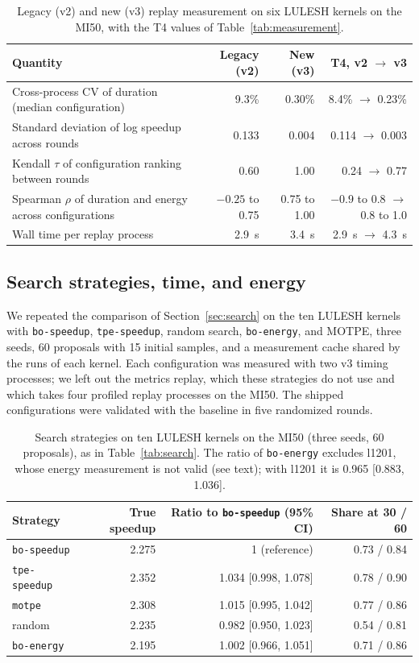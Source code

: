 \documentclass[10pt]{article}
\newcommand{\code}[1]{\texttt{#1}}
\begin{document}
\begin{table}[t]
\centering
\caption{Legacy (v2) and new (v3) replay measurement on six LULESH kernels on the MI50, with the T4 values of Table~\ref{tab:measurement}.}
\label{tab:mi50measurement}
\begin{tabular}{lrrr}
\toprule
Quantity & Legacy (v2) & New (v3) & T4, v2 $\to$ v3 \\
\midrule
Cross-process CV of duration (median configuration) & 9.3\% & 0.30\% & 8.4\% $\to$ 0.23\% \\
Standard deviation of log speedup across rounds & 0.133 & 0.004 & 0.114 $\to$ 0.003 \\
Kendall $\tau$ of configuration ranking between rounds & 0.60 & 1.00 & 0.24 $\to$ 0.77 \\
Spearman $\rho$ of duration and energy across configurations & $-0.25$ to 0.75 & 0.75 to 1.00 & $-0.9$ to 0.8 $\to$ 0.8 to 1.0 \\
Wall time per replay process & 2.9~s & 3.4~s & 2.9~s $\to$ 4.3~s \\
\bottomrule
\end{tabular}
\end{table}

\subsection{Search strategies, time, and energy}
\label{sec:amd-search}
We repeated the comparison of Section~\ref{sec:search} on the ten LULESH
kernels with \code{bo-speedup}, \code{tpe-speedup}, random search,
\code{bo-energy}, and MOTPE, three seeds, 60 proposals with 15 initial samples,
and a measurement cache shared by the runs of each kernel. Each configuration
was measured with two v3 timing processes; we left out the metrics replay,
which these strategies do not use and which takes four profiled replay
processes on the MI50. The shipped configurations were validated with the
baseline in five randomized rounds.

\begin{table}[t]
\centering
\caption{Search strategies on ten LULESH kernels on the MI50 (three seeds, 60 proposals), as in Table~\ref{tab:search}. The ratio of \code{bo-energy} excludes l1201, whose energy measurement is not valid (see text); with l1201 it is 0.965 [0.883, 1.036].}
\label{tab:mi50search}
\begin{tabular}{lrrr}
\toprule
Strategy & True speedup & Ratio to \code{bo-speedup} (95\% CI) & Share at 30 / 60 \\
\midrule
\code{bo-speedup} & 2.275 & 1 (reference) & 0.73 / 0.84 \\
\code{tpe-speedup} & 2.352 & 1.034 [0.998, 1.078] & 0.78 / 0.90 \\
\code{motpe} & 2.308 & 1.015 [0.995, 1.042] & 0.77 / 0.86 \\
random & 2.235 & 0.982 [0.950, 1.023] & 0.54 / 0.81 \\
\code{bo-energy} & 2.195 & 1.002 [0.966, 1.051] & 0.71 / 0.86 \\
\bottomrule
\end{tabular}
\end{table}
\end{document}
